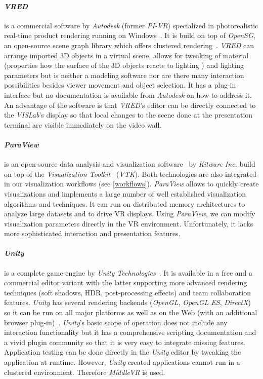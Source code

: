 \documentclass[twocolumn]{svjour3}          %
\begin{document}
\paragraph{\emph{VRED}}
is a commercial software by \emph{Autodesk} (former \emph{PI-VR}) specialized in photorealistic real-time product rendering running on Windows~\cite{web:vred}. It is build on top of \emph{OpenSG}, an open-source scene graph library which offers clustered rendering~\cite{opensg}. \emph{VRED} can arrange imported 3D objects in a virtual scene, allows for tweaking of material (properties how the surface of the 3D objects reacts to lighting ) and lighting parameters but is neither a modeling software nor are there many interaction possibilities besides viewer movement and object selection. It has a plug-in interface but no documentation is available from \emph{Autodesk} on how to address it. An advantage of the software is that \emph{VRED}'s editor can be directly connected to the \emph{VISLab}'s display so that local changes to the scene done at the presentation terminal are visible immediately on the video wall.

\paragraph{\emph{ParaView}}
is an open-source data analysis and visualization software~\cite{paraview} by \emph{Kitware Inc.} build on top of the \emph{Visualization Toolkit}~\cite{vtk} (\emph{VTK}). Both technologies are also integrated in our visualization workflows (see \ref{workflows}). \emph{ParaView} allows to quickly create visualizations and implements a large number of well established visualization algorithms and techniques. It can run on distributed memory architectures to analyze large datasets and to drive VR displays. Using \emph{ParaView}, we can modify visualization parameters directly in the VR environment. Unfortunately, it lacks more sophisticated interaction and presentation features.

\paragraph{\emph{Unity}}
is a complete game engine by \emph{Unity Technologies}~\cite{goldstone:unity3d}. It is available in a free and a commercial editor variant with the latter supporting more advanced rendering techniques (soft shadows, HDR, post-processing effects) and team collaboration features. \emph{Unity} has several rendering backends (\emph{OpenGL}, \emph{OpenGL ES}, \emph{DirectX}) so it can be run on all major platforms as well as on the Web (with an additional browser plug-in)~\cite{web:unity}. \emph{Unity}'s basic scope of operation does not include any interaction functionality but it has a comprehensive scripting documentation and a vivid plugin community so that it is very easy to integrate missing features. Application testing can be done directly in the \emph{Unity} editor by tweaking the application at runtime. However, \emph{Unity} created applications cannot run in a clustered environment. Therefore \emph{MiddleVR} is used.
\end{document}
